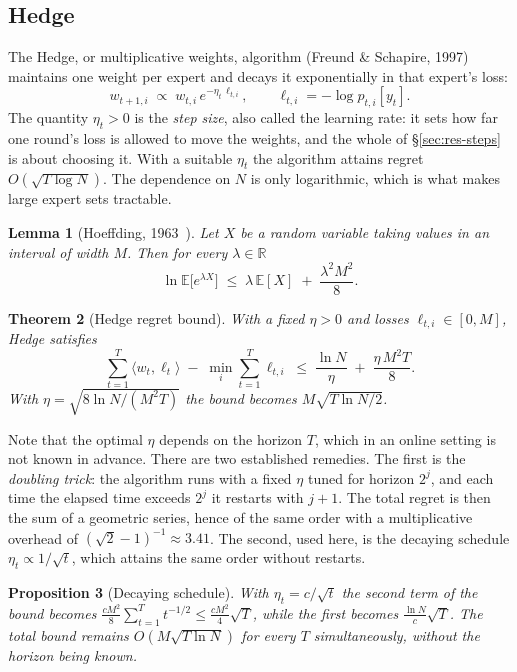 \documentclass[12pt,a4paper,oneside]{report}
\renewcommand{\_}{\oldunderscore\allowbreak}
\theoremstyle{definition}
\theoremstyle{plain}
\newtheorem{theorem}{Theorem}[chapter]
\newtheorem{lemma}[theorem]{Lemma}
\newtheorem{proposition}[theorem]{Proposition}
\theoremstyle{definition}   %
\begin{document}
\subsection{Hedge}

The Hedge, or multiplicative weights, algorithm (Freund \& Schapire, 1997)~\cite{freundschapire1997}
maintains one weight per expert and decays it exponentially in that expert's loss:
\[
w_{t+1,i} \;\propto\; w_{t,i}\, e^{-\eta_t\, \ell_{t,i}},
\qquad \ell_{t,i} = -\log p_{t,i}[y_t].
\]
The quantity $\eta_t > 0$ is the \emph{step size}, also called the learning rate: it sets how far one round's loss is allowed to move the weights, and the whole of \S\ref{sec:res-steps} is about choosing it. With a suitable $\eta_t$ the algorithm attains regret $O(\sqrt{T \log N})$. The dependence on $N$ is only
logarithmic, which is what makes large expert sets tractable.

\begin{lemma}[Hoeffding, 1963~\cite{hoeffding1963}]
\label{lem:hoeffding}
Let $X$ be a random variable taking values in an interval of width $M$. Then for every
$\lambda\in\mathbb{R}$
\[
\ln \mathbb{E}\big[e^{\lambda X}\big] \;\leq\; \lambda\, \mathbb{E}[X] \;+\; \frac{\lambda^2 M^2}{8}.
\]
\end{lemma}

\begin{theorem}[Hedge regret bound]
\label{thm:hedge}
With a fixed $\eta>0$ and losses $\ell_{t,i}\in[0,M]$, Hedge satisfies
\[
\sum_{t=1}^{T}\langle w_t, \ell_t\rangle \;-\; \min_i \sum_{t=1}^{T}\ell_{t,i}
\;\leq\; \frac{\ln N}{\eta} \;+\; \frac{\eta\, M^2 T}{8}.
\]
With $\eta = \sqrt{8\ln N/(M^2T)}$ the bound becomes $M\sqrt{T \ln N / 2}$.
\end{theorem}

Note that the optimal $\eta$ depends on the horizon $T$, which in an online setting is not
known in advance. There are two established remedies. The first is the \emph{doubling trick}:
the algorithm runs with a fixed $\eta$ tuned for horizon $2^j$, and each time the elapsed time
exceeds $2^j$ it restarts with $j\!+\!1$. The total regret is then the sum of a geometric
series, hence of the same order with a multiplicative overhead of
$(\sqrt{2}-1)^{-1}\!\approx\!3.41$. The second, used here, is the decaying schedule
$\eta_t \propto 1/\sqrt{t}$, which attains the same order without restarts.

\begin{proposition}[Decaying schedule]
\label{prop:anytime}
With $\eta_t = c/\sqrt{t}$ the second term of the bound becomes
$\frac{c M^2}{8}\sum_{t=1}^{T} t^{-1/2} \leq \frac{c M^2}{4}\sqrt{T}$, while the first becomes
$\frac{\ln N}{c}\sqrt{T}$. The total bound remains $O(M\sqrt{T\ln N})$ for every $T$
simultaneously, without the horizon being known.
\end{proposition}
\end{document}
